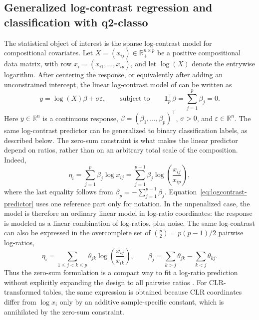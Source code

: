 \documentclass[11pt,a4paper]{article}
\newcommand{\pkg}[1]{\textbf{#1}}
\newcommand{\R}{\mathbb{R}}
\newcommand{\bbeta}{\beta}
\newcommand{\one}{\mathbf{1}}
\begin{document}

\subsection{Generalized log-contrast regression and classification with \pkg{q2-classo}}
\label{sec:logcontrast}

The statistical object of interest is the sparse log-contrast model for
compositional covariates. Let $X=(x_{ij})\in\R_+^{n\times p}$ be a positive
compositional data matrix, with row $x_i=(x_{i1},\ldots,x_{ip})$, and let
$\log(X)$ denote the entrywise logarithm. After centering the response, or
equivalently after adding an unconstrained intercept, the linear log-contrast
model of \citet{aitchison1984log} can be written as
\begin{equation}
\label{eq:forward}
y = \log(X)\bbeta + \sigma\varepsilon,
\qquad
\text{subject to}
\qquad
\one_p^\top\bbeta = \sum_{j=1}^{p}\beta_j = 0 .
\end{equation}
Here $y\in\R^n$ is a continuous response, $\bbeta=(\beta_1,\ldots,\beta_p)^\top$,
$\sigma>0$, and $\varepsilon\in\R^n$. The same log-contrast predictor can be
generalized to binary classification labels, as described below. The zero-sum constraint is what makes the linear predictor
depend on ratios, rather than on an arbitrary total scale of the composition.
Indeed,
\begin{equation}
\label{eq:logcontrast-predictor}
\eta_i
= \sum_{j=1}^{p}\beta_j \log x_{ij}
= \sum_{j=1}^{p-1}\beta_j
\log\left(\frac{x_{ij}}{x_{ip}}\right),
\end{equation}
where the last equality follows from
$\beta_p=-\sum_{j=1}^{p-1}\beta_j$. Equation~\eqref{eq:logcontrast-predictor}
uses one reference part only for notation. In the unpenalized case, the model is
therefore an ordinary linear model in log-ratio coordinates: the response is
modeled as a linear combination of log-ratios, plus noise. The same log-contrast
can also be expressed in the overcomplete set of
$\binom{p}{2}=p(p-1)/2$ pairwise log-ratios,
\begin{equation}
\eta_i =
\sum_{1\le j<k\le p}
\theta_{jk}\log\left(\frac{x_{ij}}{x_{ik}}\right),
\qquad
\beta_j =
\sum_{k>j}\theta_{jk} - \sum_{k<j}\theta_{kj}.
\end{equation}
Thus the zero-sum formulation is a compact way to fit a log-ratio prediction
without explicitly expanding the design to all pairwise ratios
\citep{bates2019log}. For CLR-transformed tables, the same expression is
obtained because CLR coordinates differ from $\log x_i$ only by an additive
sample-specific constant, which is annihilated by the zero-sum constraint.
\end{document}
